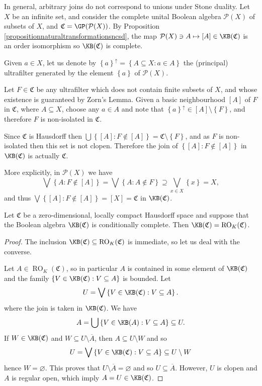 \begin{example}
	In general, arbitrary joins do not correspond to unions under Stone duality. Let $X$ be an infinite set, and consider the complete unital Boolean algebra $\mathcal{P}(X)$ of subsets of $X$, and $\mathfrak{C}=\GP(\mathcal{P}(X))$. By Proposition \ref{propositionnaturaltransformationsncsd}, the map $\mathcal{P}(X)\ni A\mapsto[A]\in\KB(\mathfrak{C})$ is an order isomorphism so $\KB(\mathfrak{C})$ is complete.
	
	Given $a\in X$, let us denote by $\left\{a\right\}^\uparrow=\left\{A\subseteq X:a\in A\right\}$ the (principal) ultrafilter generated by the element $\left\{a\right\}$ of $\mathcal{P}(X)$.
	
	Let $F\in\mathfrak{C}$ be any ultrafilter which does not contain finite subsets of $X$, and whose existence is guaranteed by Zorn's Lemma. Given a basic neighbourhood $[A]$ of $F$ in $\mathfrak{C}$, where $A\subseteq X$, choose any $a\in A$ and note that $\left\{a\right\}^\uparrow\in [A]\setminus\left\{F\right\}$, and therefore $F$ is non-isolated in $\mathfrak{C}$.
	
	Since $\mathfrak{C}$ is Hausdorff then $\bigcup\left\{[A]:F\not\in[A]\right\}=\mathfrak{C}\setminus\left\{F\right\}$, and as $F$ is non-isolated then this set is not clopen. Therefore the join of $\left\{[A]:F\not\in[A]\right\}$ in $\KB(\mathfrak{C})$ is actually $\mathfrak{C}$.
	
	More explicitly, in $\mathcal{P}(X)$ we have
	\[\bigvee\left\{A:F\not\in[A]\right\}=\bigvee\left\{A:A\not\in F\right\}\supseteq\bigvee_{x\in X}\left\{x\right\}=X,\]
	and thus $\bigvee\left\{[A]:F\not\in[A]\right\}=[X]=\mathfrak{C}$ in $\KB(\mathfrak{C})$.
\end{example}

\begin{lemma}\label{lemmawhenregularcompactopenareclopen}
Let $\mathfrak{C}$ be a zero-dimensional, locally compact Hausdorff space and suppose that the Boolean algebra $\KB(\mathfrak{C})$ is conditionally complete. Then $\KB(\mathfrak{C})=\operatorname{RO}_K(\mathfrak{C})$.
\end{lemma}
\begin{proof}
The inclusion $\KB(\mathfrak{C})\subseteq\operatorname{RO}_K(\mathfrak{C})$ is immediate, so let us deal with the converse.

Let $A\in\operatorname{RO}_K(\mathfrak{C})$, so in particular $A$ is contained in some element of $\KB(\mathfrak{C})$ and the family $\left\{V\in\KB(\mathfrak{C}):V\subseteq A\right\}$ is bounded. Let
\[U=\bigvee\left\{V\in\KB(\mathfrak{C}):V\subseteq A\right\}.\]
where the join is taken in $\KB(\mathfrak{C})$. We have
\[A=\bigcup\left\{V\in\KB(A):V\subseteq A\right\}\subseteq U.\]
If $W\in\KB(\mathfrak{C})$ and $W\subseteq U\setminus\overline{A}$, then $A\subseteq  U\setminus W$ and so
\[U=\bigvee\left\{V\in\KB(\mathfrak{C}):V\subseteq A\right\}\subseteq U\setminus W\]
hence $W=\varnothing$. This proves that $U\setminus\overline{A}=\varnothing$ and so $U\subseteq\overline{A}$. However, $U$ is clopen and $A$ is regular open, which imply $A=U\in\KB(\mathfrak{C})$.\qedhere
\end{proof}

